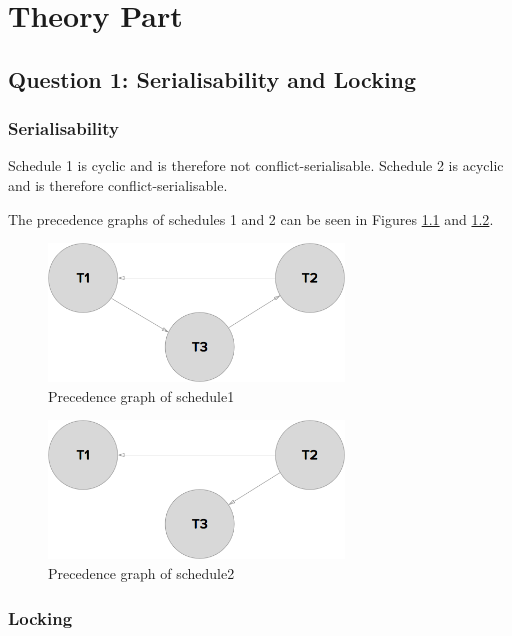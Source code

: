 \chapter{Theory Part}

\section{Question 1: Serialisability and Locking}

\subsection{Serialisability}
Schedule 1 is cyclic and is therefore not conflict-serialisable. Schedule 2 is acyclic and is therefore conflict-serialisable.

The precedence graphs of schedules 1 and 2 can be seen in Figures \ref{precedencegraph1} and \ref{precedencegraph2}.

\begin{figure}[H]
    \centering
    \includegraphics[width=0.7\textwidth]{schedule1.png}
    \caption{Precedence graph of schedule1 \label{precedencegraph1}}
\end{figure}

\begin{figure}[H]
    \centering
    \includegraphics[width=0.7\textwidth]{schedule2.png}
    \caption{Precedence graph of schedule2 \label{precedencegraph2}}
\end{figure}

\subsection{Locking}

